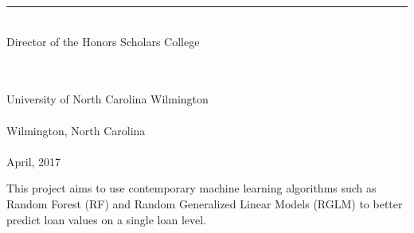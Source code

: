 \documentclass[12 pt]{uncw_thesis}
\theoremstyle{plain}
\theoremstyle{remark}
\theoremstyle{definition}
\begin{document}
\begin{singlespace}
    \rule{7.5cm}{.01in}\\
     Director of the Honors Scholars College \\
\begin{center}   
    \hskip 1pt \\
    \hskip 1pt \\    %
    University of North Carolina Wilmington\\
    \hskip 1pt \\    %
    Wilmington, North Carolina \\
    \hskip 1pt \\    %
    April, 2017\\
\end{center}
\end{singlespace}
\newpage

%
%

\newpage
\pagestyle{plain}
\begin{center}
\tableofcontents
\end{center}


%
%
\newpage
{}
This project aims to use contemporary machine learning algorithms such as Random Forest (RF) and Random Generalized Linear Models (RGLM) to better predict loan values on a single loan level.

%
%

%
%
\newpage

%
%

%
%


%
%
%
%
\newpage
{}
\end{document}

